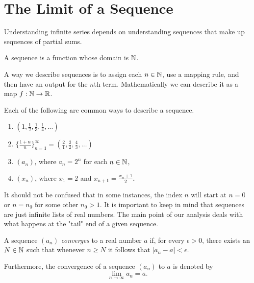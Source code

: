 
\section{The Limit of a Sequence}

Understanding infinite series depends on understanding sequences that make up sequences of partial sums.

\begin{definition}
A sequence is a function whose domain is \( \mathbb{N} \).
\end{definition}

A way we describe sequences is to assign each \( n \in \mathbb{N} \), use a mapping rule, and then have an output for the \( n \)th term. Mathematically we can describe it as a map \( f: \mathbb{N} \to \mathbb{R} \).

    Each of the following are common ways to describe a sequence. 
    \begin{enumerate}
        \item \( (1, \frac{1}{2},  \frac{1}{3}, \frac{1}{4},...  )\)
        \item \( \{  \frac{1+n}{n}  \}_{n=1}^{ \infty} = ( \frac{2}{1}, \frac{3}{2}, \frac{4}{3}, ...)\)
        \item \( (a_n) \), where \( a_n = 2^n \) for each \( n \in \mathbb{N} \),
        \item \( (x_n)\), where \( x_1 = 2 \) and \( x_{n+1} = \frac{x_n + 1 }{2}\).
    \end{enumerate}
It should not be confused that in some instances, the index \( n \) will start at \( n = 0 \) or \( n = n_0 \) for some other \( n_0 > 1 \). It is important to keep in mind that sequences are just infinite lists of real numbers. The main point of our analysis deals with what happens at the "tail" end of a given sequence. 

\begin{definition}
A sequence \( (a_n) \) \textit{converges} to a real number \( a \) if, for every \( \epsilon > 0 \), there exists an \( N \in \mathbb{N} \) such that whenever \( n \geq N \) it follows that \( |a_n - a | < \epsilon \).
\end{definition}
Furthermore, the convergence of a sequence \( (a_n) \) to \( a \) is denoted by 
\[ \lim_{n \to \infty} a_n = a.\]

